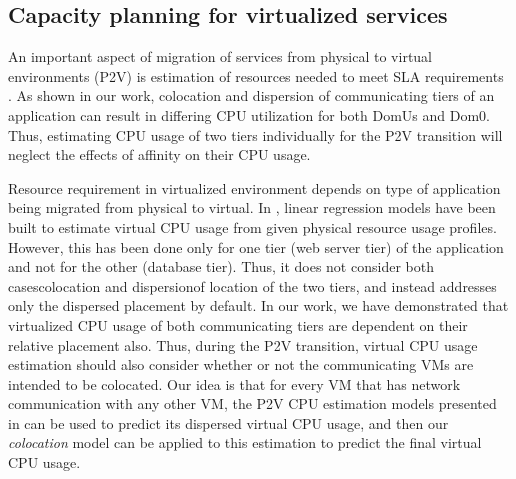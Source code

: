 \subsection{Capacity planning for virtualized services}
An important aspect of migration of services from physical to virtual
environments (P2V) is estimation of resources needed to meet SLA
requirements
\cite{migrating-n-tier-apps, migrating-service-oriented, 
legacy-app-migration}.
As shown in our work, colocation
and dispersion of communicating tiers of an application can
result in differing CPU utilization for both DomUs and Dom0.
Thus, estimating CPU usage of two tiers individually
for the P2V transition will neglect the effects of affinity 
on their CPU usage.

Resource requirement in virtualized
environment depends on type of application being migrated
from physical to virtual. 
In \cite{profiling-and-modeling}, linear regression models
have been built to estimate virtual CPU usage from given
physical resource usage profiles. However, this has been 
done only for one tier (web server tier) of the application
and not for the other (database tier). Thus, it 
does not
consider both cases\textemdash{}colocation and dispersion\textemdash{}of 
location of the two tiers, and instead addresses only the
dispersed placement by default. In our work, we have demonstrated that 
virtualized CPU usage of both communicating tiers are
dependent on their relative placement also. Thus, during
the P2V transition, virtual CPU usage estimation should
also consider whether or not the communicating VMs are intended
to be colocated. Our idea is that for every VM that has
network communication with any other VM, the P2V CPU estimation
models presented in \cite{profiling-and-modeling} can be
used to predict its dispersed virtual CPU usage, and then
our \textit{colocation} model can be applied to this estimation
to predict the final virtual CPU usage. 



